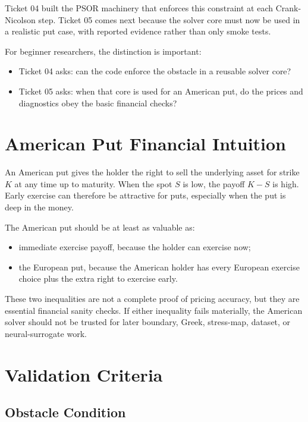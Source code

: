 \documentclass[11pt,a4paper]{article}
\begin{document}
Ticket 04 built the PSOR machinery that enforces this constraint at each Crank-Nicolson step.
Ticket 05 comes next because the solver core must now be used in a realistic put case, with
reported evidence rather than only smoke tests.

For beginner researchers, the distinction is important:
\begin{itemize}
  \item Ticket 04 asks: can the code enforce the obstacle in a reusable solver core?
  \item Ticket 05 asks: when that core is used for an American put, do the prices and diagnostics
        obey the basic financial checks?
\end{itemize}

\section{American Put Financial Intuition}

An American put gives the holder the right to sell the underlying asset for strike \(K\) at any
time up to maturity. When the spot \(S\) is low, the payoff \(K-S\) is high. Early exercise can
therefore be attractive for puts, especially when the put is deep in the money.

The American put should be at least as valuable as:
\begin{itemize}
  \item immediate exercise payoff, because the holder can exercise now;
  \item the European put, because the American holder has every European exercise choice plus the
        extra right to exercise early.
\end{itemize}

These two inequalities are not a complete proof of pricing accuracy, but they are essential
financial sanity checks. If either inequality fails materially, the American solver should not be
trusted for later boundary, Greek, stress-map, dataset, or neural-surrogate work.

\section{Validation Criteria}

\subsection{Obstacle Condition}
\end{document}
